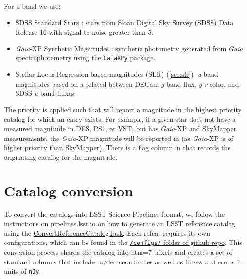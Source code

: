 For \textit{u}-band we use:
\begin{itemize}
    \item SDSS Standard Stars \citep[Section \ref{sec:sdss};][]{2020ApJS..249....3A}: stars from Sloan Digital Sky Survey (SDSS) Data Release 16 with signal-to-noise greater than 5.
    \item \emph{Gaia}-XP Synthetic Magnitudes \citep[Section \ref{sec:gaiaxp}][]{2023A&A...674A..33G}: synthetic photometry generated from \emph{Gaia} spectrophotometry using the \texttt{GaiaXPy} package.
    \item Stellar Locus Regression-based magnitudes (SLR) (\ref{sec:slr}): \textit{u}-band magnitudes based on a related between DECam \textit{g}-band flux, \textit{g-r} color, and SDSS \textit{u}-band fluxes.
\end{itemize}

The priority is applied such that \monster will report a magnitude in the highest priority catalog for which an entry exists. For example, if a given star does not have a measured magnitude in DES, PS1, or VST, but has \emph{Gaia}-XP and SkyMapper measurements, the \emph{Gaia}-XP magnitude will be reported in \monster (as \emph{Gaia}-XP is of higher priority than SkyMapper). There is a flag column in \monster that records the originating catalog for the magnitude.

\section{Catalog conversion}
\label{sec:conversion}
To convert the catalogs into LSST Science Pipelines format, we follow the instructions on \href{https://pipelines.lsst.io/modules/lsst.meas.algorithms/creating-a-reference-catalog.html}{pipelines.lsst.io} on how to generate an LSST reference catalog using the \href{https://pipelines.lsst.io/modules/lsst.meas.algorithms/tasks/lsst.meas.algorithms.ConvertReferenceCatalogTask.html#lsst-task-lsst-meas-algorithms-convertreferencecatalog-convertreferencecatalogtask}{ConvertReferenceCatalogTask}. Each refcat requires its own configurations, which can be found in the \href{https://github.com/lsst-dm/the_monster/tree/main/configs}{\texttt{/configs/} folder of \monster github repo}.
This conversion process shards the catalog into htm=7 trixels and creates a set of standard columns that include ra/dec coordinates as well as fluxes and errors in units of \texttt{nJy}.

